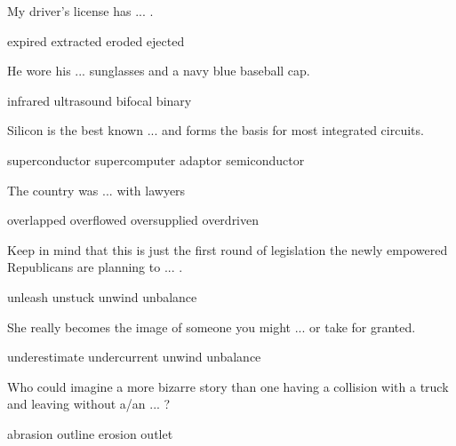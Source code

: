 \documentclass{exam}
\begin{document}
\begin{questions}
\question My driver's license has ... .\\
\begin{oneparchoices} 
\correctchoice expired
 \choice extracted 
 \choice eroded
 \choice ejected
\end{oneparchoices}
\question He wore his ... sunglasses and a navy blue baseball cap.\\
\begin{oneparchoices} 
\choice infrared
 \choice ultrasound
\correctchoice bifocal
 \choice binary 
\end{oneparchoices}
\question Silicon is the best known ... and forms the basis for most integrated circuits.\\
\begin{oneparchoices} 
\choice superconductor
\choice supercomputer
\choice adaptor
\correctchoice semiconductor
\end{oneparchoices}
\question The country was ... with lawyers\\
\begin{oneparchoices} 
\choice overlapped
\choice overflowed
\correctchoice oversupplied 
\choice overdriven
\end{oneparchoices}
\question Keep in mind that this is just the first round of legislation the newly empowered Republicans are planning to ... .\\
\begin{oneparchoices} 
\correctchoice unleash
\choice unstuck
\choice unwind
\choice unbalance 
\end{oneparchoices}
\question She really becomes the image of someone you might ... or take for granted.\\
\begin{oneparchoices} 
\correctchoice underestimate
\choice undercurrent
\choice unwind
\choice unbalance
\end{oneparchoices}
\question Who could imagine a more bizarre story than one having a collision with a truck and leaving without a/an ... ?\\
\begin{oneparchoices} 
\correctchoice abrasion
\choice outline
\choice erosion
\choice outlet 
\end{oneparchoices}


\end{questions}
\end{document}
